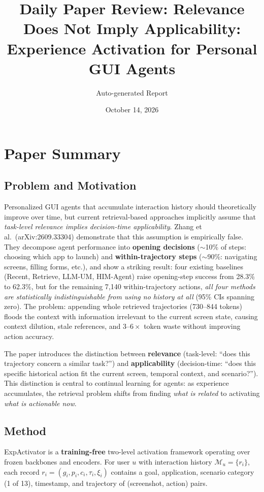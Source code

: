\documentclass[11pt,a4paper]{article}
\title{Daily Paper Review: Relevance Does Not Imply Applicability: Experience Activation for Personal GUI Agents}
\author{Auto-generated Report}
\date{October 14, 2026}
\begin{document}
\maketitle

\section{Paper Summary}

\subsection{Problem and Motivation}
Personalized GUI agents that accumulate interaction history should theoretically improve over time, but current retrieval-based approaches implicitly assume that \emph{task-level relevance implies decision-time applicability}. Zhang et al.\ (arXiv:2609.33304) demonstrate that this assumption is empirically false. They decompose agent performance into \textbf{opening decisions} ($\sim$10\% of steps: choosing which app to launch) and \textbf{within-trajectory steps} ($\sim$90\%: navigating screens, filling forms, etc.), and show a striking result: four existing baselines (Recent, Retrieve, LLM-UM, HIM-Agent) raise opening-step success from 28.3\% to 62.3\%, but for the remaining 7,140 within-trajectory actions, \emph{all four methods are statistically indistinguishable from using no history at all} (95\% CIs spanning zero). The problem: appending whole retrieved trajectories (730--844 tokens) floods the context with information irrelevant to the current screen state, causing context dilution, stale references, and $3$--$6\times$ token waste without improving action accuracy.

The paper introduces the distinction between \textbf{relevance} (task-level: ``does this trajectory concern a similar task?'') and \textbf{applicability} (decision-time: ``does this specific historical action fit the current screen, temporal context, and scenario?''). This distinction is central to continual learning for agents: as experience accumulates, the retrieval problem shifts from finding \emph{what is related} to activating \emph{what is actionable now}.

\subsection{Method}
ExpActivator is a \textbf{training-free} two-level activation framework operating over frozen backbones and encoders. For user $u$ with interaction history $\mathcal{M}_u = \{r_i\}$, each record $r_i = (g_i, p_i, c_i, \tau_i, \xi_i)$ contains a goal, application, scenario category (1 of 13), timestamp, and trajectory of (screenshot, action) pairs.
\end{document}
